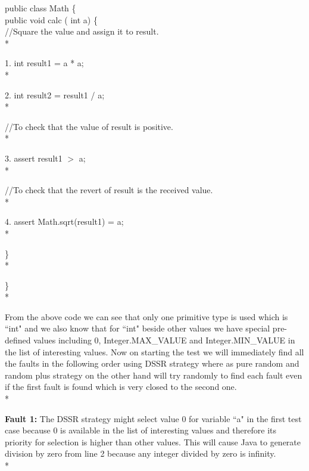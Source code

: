 public class Math \{\\

\hspace{7mm} public void calc ( int a) \{\\

//Square the value and assign it to result.\\*

1.\hspace{12mm} int result1 = a * a;\\*

2. \hspace{12mm}int result2 = result1 / a;\\*

//To check that the value of result is positive.\\*

3.\hspace{12mm} assert result1 $>$ a;\\*

//To check that the revert of result is the received value.\\*

4. \hspace{12mm}assert Math.sqrt(result1) = a;\\*



\hspace{7mm}\}  \\*

\}\\*

\hspace{10 mm}From the above code we can see that only one primitive type is used which is ``int" and we also know that for ``int" beside other values we have special pre-defined values including 0, Integer.MAX\_VALUE and Integer.MIN\_VALUE in the list of interesting values. Now on starting the test we will immediately find all the faults in the following order using DSSR strategy where as pure random and random plus strategy on the other hand will try randomly to find each fault even if the first fault is found which is very closed to the second one.\\*



\textbf{Fault 1:} The DSSR strategy might select value 0 for variable ``a"  in the first test case because 0 is available in the list of interesting values and therefore its priority for selection is higher than other values. This will cause Java to generate division by zero from line 2 because any integer divided by zero is infinity.\\*

